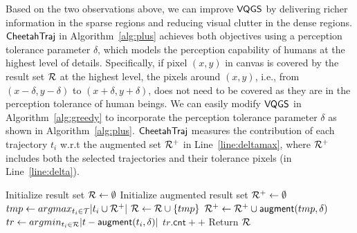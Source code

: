 
Based on the two observations above, we can improve  $\mathsf{VQGS}$ by delivering richer information in the sparse regions and reducing visual clutter in the dense regions. $\mathsf{CheetahTraj}$ in Algorithm~\ref{alg:plus} achieves both objectives using a perception tolerance parameter $\delta$, which models the perception capability of humans at the highest level of details.
Specifically, if pixel $(x,y)$ in canvas is covered by the result set $\mathcal{R}$ at the highest level,
the pixels around $(x,y)$, i.e., from $(x-\delta, y-\delta)$ to $(x+\delta, y+\delta)$, does not need to be covered as  they are in the perception tolerance of human beings. We can easily modify $\mathsf{VQGS}$ in Algorithm~\ref{alg:greedy} to incorporate the perception tolerance parameter $\delta$ as shown in Algorithm~\ref{alg:plus}. $\mathsf{CheetahTraj}$ measures the contribution of each trajectory $t_i$ w.r.t the augmented set $\mathcal{R}^{+}$ in Line~\ref{line:deltamax},
where $\mathcal{R}^{+}$ includes both the selected trajectories and their tolerance pixels (in Line~\ref{line:delta}).      

  



%
\begin{algorithm}
    \caption{$\avats(\D,k=\alpha |\D|,\delta)$} \label{alg:plus}
    \begin{algorithmic}[1]
    \State Initialize result set $\mathcal{R} \leftarrow \emptyset$
    \State Initialize augmented result set $\mathcal{R}^{+} \leftarrow \emptyset$
        \State $tmp \leftarrow argmax_{t_i \in \mathcal{T}} | t_i  \cup \mathcal{R}^{+} |$ \label{line:deltamax}
        \State $\mathcal{R} \leftarrow \mathcal{R} \cup \{ tmp \}$
        \State $\mathcal{R}^{+} \leftarrow \mathcal{R}^{+} \cup \mathsf{augment}(tmp, \delta)$\label{line:delta}
    \EndWhile
      \label{line:s}
        \State $tr \leftarrow argmin_{t_i \in \mathcal{R}}{|t-\mathsf{augment}(t_i, \delta)|}$
        \State $tr.\mathsf{cnt}++$ \label{line:e}
    \EndFor
    \State Return $\mathcal{R}$
    \end{algorithmic}
\end{algorithm}


